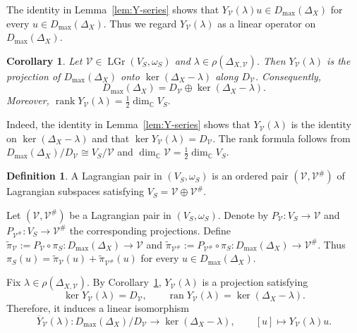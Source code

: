 \documentclass[12pt]{amsart}
\theoremstyle{plain}
\newtheorem{cor}[thm]{Corollary}
\theoremstyle{definition}
\newtheorem{defn}[thm]{Definition}
\theoremstyle{remark}
\numberwithin{equation}{section} \numberwithin{figure}{section}
\renewcommand*{\to}{\rightarrow}
\begin{document}
The identity in Lemma~\ref{lem:Y-series} shows that
\(Y_{\mathcal V}(\lambda)u\in D_{\max}(\Delta_X)\) for every
\(u\in D_{\max}(\Delta_X)\). Thus we regard
\(Y_{\mathcal V}(\lambda)\) as a linear operator on
\(D_{\max}(\Delta_X)\).

\begin{cor}\label{cor:Y-projection}
Let
\(\mathcal V\in\operatorname{LGr}(V_S,\omega_S)\) and
\(\lambda\in\rho(\Delta_{X,\mathcal V})\). Then
\(Y_{\mathcal V}(\lambda)\) is the projection of
\(D_{\max}(\Delta_X)\) onto \(\ker(\Delta_X-\lambda)\) along
\(D_{\mathcal V}\). Consequently,
\[
D_{\max}(\Delta_X)
=
D_{\mathcal V}\oplus\ker(\Delta_X-\lambda).
\]
Moreover,
\(
\operatorname{rank}Y_{\mathcal V}(\lambda)
=
\frac12\dim_{\mathbb C}V_S.
\)
\end{cor}

Indeed, the identity in Lemma~\ref{lem:Y-series} shows that
\(Y_{\mathcal V}(\lambda)\) is the identity on
\(\ker(\Delta_X-\lambda)\) and that
\(\ker Y_{\mathcal V}(\lambda)=D_{\mathcal V}\). The rank formula
follows from
\(
D_{\max}(\Delta_X)/D_{\mathcal V}\cong V_S/\mathcal V
\)
and
\(
\dim_{\mathbb C}\mathcal V
=
\frac12\dim_{\mathbb C}V_S.
\)

\begin{defn}
A Lagrangian pair in \((V_S,\omega_S)\) is an ordered pair
\((\mathcal V,\mathcal V^\#)\) of Lagrangian subspaces satisfying
\(V_S=\mathcal V\oplus\mathcal V^\#\).
\end{defn}


Let \((\mathcal V,\mathcal V^\#)\) be a Lagrangian pair in
\((V_S,\omega_S)\). Denote by
\(P_{\mathcal V}:V_S\to\mathcal V\) and
\(P_{\mathcal V^\#}:V_S\to\mathcal V^\#\) the corresponding
projections. Define
\(\widetilde{\pi}_{\mathcal V}
:=P_{\mathcal V}\circ\pi_S:
D_{\max}(\Delta_X)\to\mathcal V\)
and
\(\widetilde{\pi}_{\mathcal V^\#}
:=P_{\mathcal V^\#}\circ\pi_S:
D_{\max}(\Delta_X)\to\mathcal V^\#\).
Thus
\(
\pi_S(u)
=
\widetilde{\pi}_{\mathcal V}(u)
+
\widetilde{\pi}_{\mathcal V^\#}(u)
\)
for every \(u\in D_{\max}(\Delta_X)\).

Fix \(\lambda\in\rho(\Delta_{X,\mathcal V})\). By
Corollary~\ref{cor:Y-projection},
\(Y_{\mathcal V}(\lambda)\) is a projection satisfying
\[
\ker Y_{\mathcal V}(\lambda)=D_{\mathcal V},
\qquad
\operatorname{ran}Y_{\mathcal V}(\lambda)
=
\ker(\Delta_X-\lambda).
\]
Therefore, it induces a linear isomorphism
\[
\overline{Y}_{\mathcal V}(\lambda):
D_{\max}(\Delta_X)/D_{\mathcal V}
\longrightarrow
\ker(\Delta_X-\lambda),
\qquad
[u]\longmapsto Y_{\mathcal V}(\lambda)u.
\]
\end{document}
